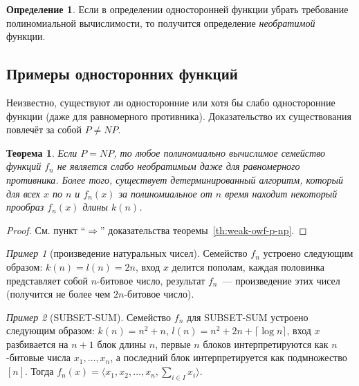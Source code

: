 \documentclass[12pt,a4paper]{article}
\theoremstyle{definition}
\newtheorem{definition}{Определение}[section]
\theoremstyle{plain}
\newtheorem{theorem}{Теорема}[section]
\theoremstyle{remark}
\newtheorem{example}{Пример}[section]
\begin{document}
\begin{definition}
Если в определении односторонней функции убрать требование полиномиальной вычислимости,
то получится определение \emph{необратимой} функции.
\end{definition}

\subsection{Примеры односторонних функций}

Неизвестно, существуют ли односторонние или хотя бы слабо односторонние функции 
(даже для равномерного противника). Доказательство их существования повлечёт
за собой $P \neq NP$.

\begin{theorem}
Если $P=NP$, то любое полиномиально вычислимое семейство функций $f_n$ не является
слабо необратимым даже для равномерного противника. Более того, 
существует детерминированный алгоритм, который для всех $x$ по $n$ и 
$f_n(x)$ за полиномиальное от $n$ время находит некоторый прообраз 
$f_n(x)$ длины $k(n)$.
\end{theorem}
\begin{proof}
См. пункт ``$\Rightarrow$'' доказательства теоремы~\ref{th:weak-owf-p-np}.
\end{proof}
\begin{example}[произведение натуральных чисел]
Семейство $f_n$ устроено следующим образом: $k(n) = l(n) = 2n$, вход $x$ делится пополам, каждая половинка представляет собой $n$-битовое число, результат $f_n$~--- произведение этих чисел (получится не более чем $2n$-битовое число).
\end{example}
\begin{example}[SUBSET-SUM]
Семейство $f_n$ для SUBSET-SUM устроено следующим образом: 
$k(n) = n^2 + n$, $l(n) = n^2 + 2n + \lceil\log n\rceil$,
вход $x$ разбивается на $n+1$ блок длины $n$, 
первые $n$ блоков интерпретируются как $n$-битовые числа $x_1, \dotsc, x_n$, 
а последний блок интерпретируется как подмножество $[n]$. Тогда
$f_n(x) = \bigl\langle x_1, x_2, \dotsc, x_n, \sum_{i\in I} x_i \bigr\rangle$.
\end{example}
\end{document}
